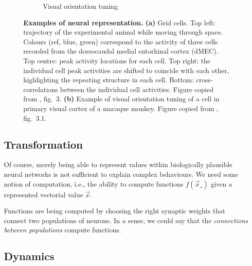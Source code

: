 \documentclass[10pt,letterpaper,oneside]{article}
\begin{document}
\begin{figure}[t]
\begin{subfigure}[b]{0.5\columnwidth}
		\caption{Visual orientation tuning}
		\label{fig:eliasmith_et_al_2003_orientation_tuning}
	\end{subfigure}
	\caption{\textbf{Examples of neural representation.} \textbf{(a)} Grid cells. Top left: trajectory of the experimental animal while moving through space. Colours (ref, blue, green) correspond to the activity of three cells recorded from the dorsocaudal medial entorhinal cortex (dMEC). Top centre: peak activity locations for each cell. Top right: the individual cell peak activities are shifted to coincide with each other, highlighting the repeating structure in each cell. Bottom: cross-correlations between the individual cell activities. Figure copied from \cite{hafting2005microstructure}, fig.~3. \textbf{(b)} Example of visual orientation tuning of a cell in primary visual cortex of a macaque monkey. Figure copied from \cite{eliasmith2003neural}, fig.~3.1.}
\end{figure}


\subsection{Transformation}

Of course, merely being able to represent values within biologically plausible neural networks is not sufficient to explain complex behaviours. We need some notion of computation, i.e., the ability to compute functions $f(\vec x¸)$ given a represented vectorial value $\vec x$.

Functions are being computed by choosing the right synaptic weights that connect two populations of neurons. In a sense, we could say that the \emph{connections between populations} compute functions.

\subsection{Dynamics}


\printbibliography
\end{document}
